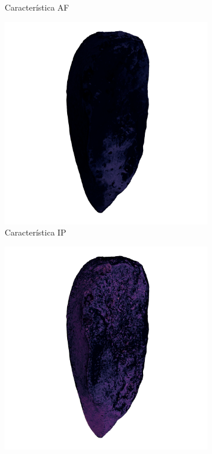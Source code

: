 \begin{figure}[p]
\begin{subfigure}{0.4\textwidth}
        \caption{Característica AF}
        \label{fig5:grad_af}
    \end{subfigure}
    \begin{subfigure}{0.4\textwidth}
        \centering
        \includegraphics[width=\linewidth]{../../scripts/misc/grad-cam/53-L/53-L_ip_left.png}
        \caption{Característica IP}
        \label{fig5:grad_bn}
    \end{subfigure}
    \begin{subfigure}{0.4\textwidth}
        \centering
        \includegraphics[width=\linewidth]{../../scripts/misc/grad-cam/53-L/53-L_dp_left.png}

\end{subfigure}
\end{figure}
